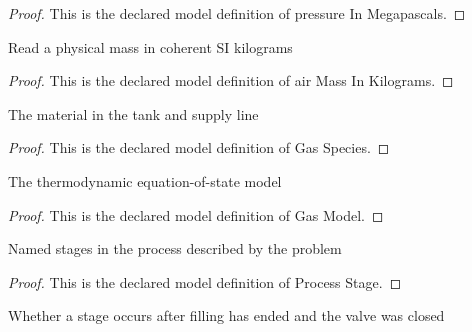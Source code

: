 \begin{proof}
  This is the declared model definition of pressure In Megapascals.
\end{proof}
\begin{definition}
  \label{def:physics:phyx-mini-0401:phyxminiproblems-problemphyxmini0401-airmassinkilograms}
  Read a physical mass in coherent SI kilograms
\end{definition}
\begin{proof}
  This is the declared model definition of air Mass In Kilograms.
\end{proof}
\begin{definition}
  \label{def:physics:phyx-mini-0401:phyxminiproblems-problemphyxmini0401-gasspecies}
  The material in the tank and supply line
\end{definition}
\begin{proof}
  This is the declared model definition of Gas Species.
\end{proof}
\begin{definition}
  \label{def:physics:phyx-mini-0401:phyxminiproblems-problemphyxmini0401-gasmodel}
  The thermodynamic equation-of-state model
\end{definition}
\begin{proof}
  This is the declared model definition of Gas Model.
\end{proof}
\begin{definition}
  \label{def:physics:phyx-mini-0401:phyxminiproblems-problemphyxmini0401-processstage}
  Named stages in the process described by the problem
\end{definition}
\begin{proof}
  This is the declared model definition of Process Stage.
\end{proof}
\begin{definition}
  \label{def:physics:phyx-mini-0401:phyxminiproblems-problemphyxmini0401-ispostclosurestage}
  Whether a stage occurs after filling has ended and the valve was closed
\end{definition}
